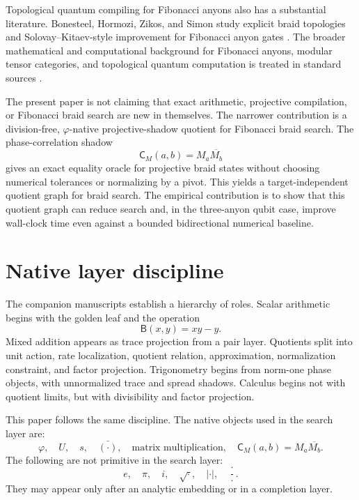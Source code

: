 \documentclass[11pt]{article}
\newcommand{\ph}{\varphi}
\newcommand{\B}{\mathsf B}
\newcommand{\shadow}{\mathsf C}
\begin{document}
Topological quantum compiling for Fibonacci anyons also has a substantial literature.  Bonesteel, Hormozi, Zikos, and Simon study explicit braid topologies and Solovay--Kitaev-style improvement for Fibonacci anyon gates \cite{BonesteelHormoziZikosSimon2005,HormoziZikosBonesteelSimon2007}.  The broader mathematical and computational background for Fibonacci anyons, modular tensor categories, and topological quantum computation is treated in standard sources \cite{Kitaev2003,FreedmanKitaevLarsenWang2003,WangBook,PreskillNotes}.

The present paper is not claiming that exact arithmetic, projective compilation, or Fibonacci braid search are new in themselves.  The narrower contribution is a division-free, $\ph$-native projective-shadow quotient for Fibonacci braid search.  The phase-correlation shadow
\[
    \shadow_M(a,b)=M_a\overline{M_b}
\]
gives an exact equality oracle for projective braid states without choosing numerical tolerances or normalizing by a pivot.  This yields a target-independent quotient graph for braid search.  The empirical contribution is to show that this quotient graph can reduce search and, in the three-anyon qubit case, improve wall-clock time even against a bounded bidirectional numerical baseline.


\section{Native layer discipline}

The companion manuscripts establish a hierarchy of roles.  Scalar arithmetic begins with the golden leaf and the operation
\[
    \B(x,y)=xy-y.
\]
Mixed addition appears as trace projection from a pair layer.  Quotients split into unit action, rate localization, quotient relation, approximation, normalization constraint, and factor projection.  Trigonometry begins from norm-one phase objects, with unnormalized trace and spread shadows.  Calculus begins not with quotient limits, but with divisibility and factor projection.

This paper follows the same discipline.  The native objects used in the search layer are:
\[
    \ph,\quad U,\quad s,\quad \bar{(\cdot)},\quad
    \text{matrix multiplication},\quad
    \shadow_M(a,b)=M_a\overline{M_b}.
\]
The following are not primitive in the search layer:
\[
    e,\quad \pi,\quad i,\quad \sqrt{\cdot},\quad
    |\cdot|,\quad \frac{\cdot}{\cdot}.
\]
They may appear only after an analytic embedding or in a completion layer.
\end{document}
